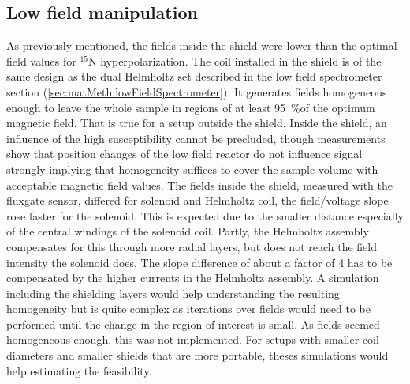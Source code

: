         \subsection{Low field manipulation}
            As previously mentioned, the fields inside the shield were lower than the optimal field values for $^{15}$N hyperpolarization. The coil installed in the shield is of the same design as the dual Helmholtz set described in the low field spectrometer section (\ref{sec:matMeth:lowFieldSpectrometer}). It generates fields homogeneous enough to leave the whole sample in regions of at least \SI{95}{\%}of the optimum magnetic field. That is true for a setup outside the shield. Inside the shield, an influence of the high susceptibility cannot be precluded, though measurements show that position changes of the low field reactor do not influence signal strongly implying that homogeneity suffices to cover the sample volume with acceptable magnetic field values. The fields inside the shield, measured with the fluxgate sensor, differed for solenoid and Helmholtz coil, the field/voltage slope rose faster for the solenoid. This is expected due to the smaller distance especially of the central windings of the solenoid coil. Partly, the Helmholtz assembly compensates for this through more radial layers, but does not reach the field intensity the solenoid does. The slope difference of about a factor of 4 has to be compensated by the higher currents in the Helmholtz assembly. A simulation including the shielding layers would help understanding the resulting homogeneity but is quite complex as iterations over fields would need to be performed until the change in the region of interest is small. As fields seemed homogeneous enough, this was not implemented. For setups with smaller coil diameters and smaller shields that are more portable, theses simulations would help estimating the feasibility.
